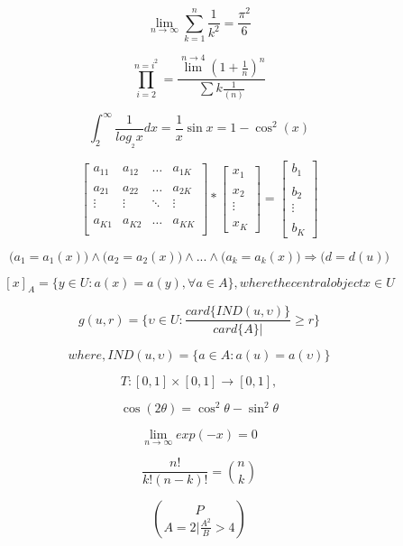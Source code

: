 \documentclass{article}
\begin{document}
$$\lim_{n\to\infty}
\sum_{k=1}^n \frac{1}{k^2}
=\frac{\pi^2}{6}$$


$$\prod_{i=2}^{n=i^{2}} = \frac{\lim^{n\to 4}(1+\frac{1}{n})^{n}}{\sum{k{\frac{1}{(n)}}}}$$

$$\int_{2}^{\infty} \frac{1}{log_{_2}x}dx = \frac{1}{x}{\sin{x}} = 1 - {\cos^2}{(x)}$$

$$
\left [\begin{array}{cccc}
a_{11}& a_{12} & \ldots & a_{1K}\\
\\ 
a_{21}& a_{22} &\ldots & a_{2K}\\
\vdots & \vdots & \ddots & \vdots\\
\\
a_{K1}& a_{K2} &\ldots & a_{KK}\\ 
\end{array}\right] * 
\left [\begin{array}{cccc} 
x_{1}\\
\\
x_{2}\\
\vdots\\
\\ 
 x_{K} 
\end{array}\right] 
= \left [\begin{array}{cccc}
b_{1}\\
\\
b_{2}\\
\vdots\\
\\
b_{K}
\end{array}\right]
$$

$$(a_{1} = a_{1}{(x))} \wedge (a_{2} = a_{2}{(x))} \wedge ... \wedge (a_{k} = a_{k}{(x))} \Rightarrow (d = d{(u))}$$


$$[{x}]_A = \{y\in U : a{(x)} = a{(y)}, \forall{a} \in A \} , where  the  central  object x \in U$$


$$ g{(u,r)} = \{\upsilon \in U : \frac{card\{IND(u,\upsilon)\}}{card\{A\}|} \geq r \}$$

$$ where, IND(u,\upsilon) = \{a \in A : a{(u)} = a{(\upsilon)}\}$$

$$ T : [0,1] \times [0,1] \to [0,1],$$

$$ \cos(2\theta) = \cos^{2} \theta - \sin^{2} \theta$$

$$ \lim_{n\to\infty} exp(-x) = 0$$


$$ \frac{n!}{k!(n - k)!} = {n \choose k}$$

$$ {P} \choose {A = 2 |\frac{A^2}{B} > 4}$$
\end{document}
